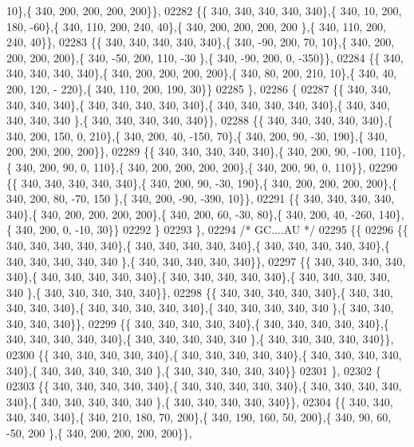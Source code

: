 \begin{DoxyCode}
      10\},\{ 340, 200, 200, 200, 200\}\},
02282 \{\{ 340, 340, 340, 340, 340\},\{ 340,  10, 200, 180, -60\},\{ 340, 110, 200, 240,  40\},\{ 340, 200, 200, 200, 200
      \},\{ 340, 110, 200, 240,  40\}\},
02283 \{\{ 340, 340, 340, 340, 340\},\{ 340, -90, 200,  70,  10\},\{ 340, 200, 200, 200, 200\},\{ 340, -50, 200, 110, -30
      \},\{ 340, -90, 200,   0, -350\}\},
02284 \{\{ 340, 340, 340, 340, 340\},\{ 340, 200, 200, 200, 200\},\{ 340,  80, 200, 210,  10\},\{ 340,  40, 200, 120, -
      220\},\{ 340, 110, 200, 190,  30\}\}
02285 \},
02286 \{
02287 \{\{ 340, 340, 340, 340, 340\},\{ 340, 340, 340, 340, 340\},\{ 340, 340, 340, 340, 340\},\{ 340, 340, 340, 340, 340
      \},\{ 340, 340, 340, 340, 340\}\},
02288 \{\{ 340, 340, 340, 340, 340\},\{ 340, 200, 150,   0, 210\},\{ 340, 200,  40, -150,  70\},\{ 340, 200,  90, -30, 
      190\},\{ 340, 200, 200, 200, 200\}\},
02289 \{\{ 340, 340, 340, 340, 340\},\{ 340, 200,  90, -100, 110\},\{ 340, 200,  90,   0, 110\},\{ 340, 200, 200, 200, 
      200\},\{ 340, 200,  90,   0, 110\}\},
02290 \{\{ 340, 340, 340, 340, 340\},\{ 340, 200,  90, -30, 190\},\{ 340, 200, 200, 200, 200\},\{ 340, 200,  80, -70, 150
      \},\{ 340, 200, -90, -390,  10\}\},
02291 \{\{ 340, 340, 340, 340, 340\},\{ 340, 200, 200, 200, 200\},\{ 340, 200,  60, -30,  80\},\{ 340, 200,  40, -260, 
      140\},\{ 340, 200,   0, -10,  30\}\}
02292 \}
02293 \},
02294 \textcolor{comment}{/* GC....AU */}
02295 \{\{
02296 \{\{ 340, 340, 340, 340, 340\},\{ 340, 340, 340, 340, 340\},\{ 340, 340, 340, 340, 340\},\{ 340, 340, 340, 340, 340
      \},\{ 340, 340, 340, 340, 340\}\},
02297 \{\{ 340, 340, 340, 340, 340\},\{ 340, 340, 340, 340, 340\},\{ 340, 340, 340, 340, 340\},\{ 340, 340, 340, 340, 340
      \},\{ 340, 340, 340, 340, 340\}\},
02298 \{\{ 340, 340, 340, 340, 340\},\{ 340, 340, 340, 340, 340\},\{ 340, 340, 340, 340, 340\},\{ 340, 340, 340, 340, 340
      \},\{ 340, 340, 340, 340, 340\}\},
02299 \{\{ 340, 340, 340, 340, 340\},\{ 340, 340, 340, 340, 340\},\{ 340, 340, 340, 340, 340\},\{ 340, 340, 340, 340, 340
      \},\{ 340, 340, 340, 340, 340\}\},
02300 \{\{ 340, 340, 340, 340, 340\},\{ 340, 340, 340, 340, 340\},\{ 340, 340, 340, 340, 340\},\{ 340, 340, 340, 340, 340
      \},\{ 340, 340, 340, 340, 340\}\}
02301 \},
02302 \{
02303 \{\{ 340, 340, 340, 340, 340\},\{ 340, 340, 340, 340, 340\},\{ 340, 340, 340, 340, 340\},\{ 340, 340, 340, 340, 340
      \},\{ 340, 340, 340, 340, 340\}\},
02304 \{\{ 340, 340, 340, 340, 340\},\{ 340, 210, 180,  70, 200\},\{ 340, 190, 160,  50, 200\},\{ 340,  90,  60, -50, 200
      \},\{ 340, 200, 200, 200, 200\}\},

\end{DoxyCode}
